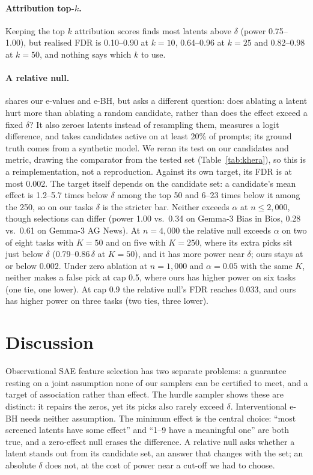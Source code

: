 \paragraph{Attribution top-$k$.} Keeping the top $k$ attribution scores finds most latents above $\delta$ (power 0.75--1.00),
but realised FDR is 0.10--0.90 at $k = 10$, 0.64--0.96 at $k = 25$ and 0.82--0.98 at $k = 50$, and nothing says which $k$ to use.

\paragraph{A relative null.} \citet{khera2026} shares our e-values and e-BH, but asks a different question: does ablating a
latent hurt more than ablating a random candidate, rather than does the effect exceed a fixed $\delta$? It also zeroes latents
instead of resampling them, measures a logit difference, and takes candidates active on at least 20\% of prompts; its
ground truth comes from a synthetic model. We reran its test on our candidates and metric, drawing the comparator from the
tested set (Table~\ref{tab:khera}), so this is a reimplementation, not a reproduction. Against its own target, its FDR is at most 0.002. The target itself depends on the candidate set: a candidate's mean effect is 1.2--5.7 times below $\delta$ among the
top 50 and 6--23 times below it among the 250, so on our tasks $\delta$ is the stricter bar. Neither exceeds $\alpha$ at $n \le 2{,}000$, though selections can differ (power 1.00 vs.\ 0.34 on Gemma-3 Bias in Bios, 0.28
vs.\ 0.61 on Gemma-3 AG News). At $n = 4{,}000$ the relative null exceeds $\alpha$ on two of eight tasks with $K = 50$ and on five with $K = 250$,
where its extra picks sit just below $\delta$ (0.79--0.86$\,\delta$ at $K = 50$), and it has more power near $\delta$; ours stays at or
below 0.002. Under zero ablation at $n = 1{,}000$ and $\alpha = 0.05$ with the same $K$, neither makes a false pick at cap 0.5, where ours has higher power on six tasks (one tie, one lower). At cap 0.9 the relative null's FDR reaches 0.033, and ours has higher power on three tasks (two ties, three lower).

\section{Discussion}
\label{sec:discussion}

Observational SAE feature selection has two separate problems: a guarantee resting on a joint assumption none of our samplers
can be certified to meet, and a target of association rather than effect. The hurdle sampler shows these are distinct: it repairs
the zeros, yet its picks also rarely exceed $\delta$. Interventional e-BH needs neither assumption. The
minimum effect is the central choice: ``most screened latents have some effect'' and ``1--9 have a meaningful one'' are both true,
and a zero-effect null erases the difference. A relative null asks whether a latent stands out from its candidate set, an answer
that changes with the set; an absolute $\delta$ does not, at the cost of power near a cut-off we had to choose.

